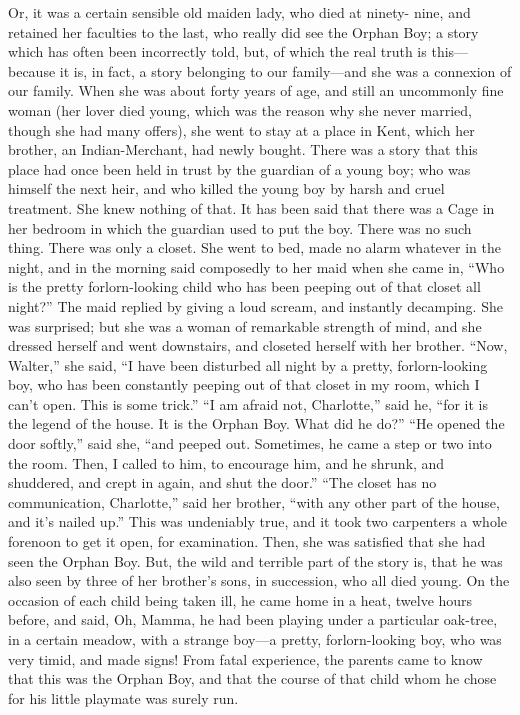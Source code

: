 Or, it was a certain sensible old maiden lady, who died at ninety-%
nine, and retained her faculties to the last, who really did see the
Orphan Boy; a story which has often been incorrectly told, but, of
which the real truth is this---because it is, in fact, a story
belonging to our family---and she was a connexion of our family.
When she was about forty years of age, and still an uncommonly fine
woman (her lover died young, which was the reason why she never
married, though she had many offers), she went to stay at a place in
Kent, which her brother, an Indian-Merchant, had newly bought.
There was a story that this place had once been held in trust by the
guardian of a young boy; who was himself the next heir, and who
killed the young boy by harsh and cruel treatment.  She knew nothing
of that.  It has been said that there was a Cage in her bedroom in
which the guardian used to put the boy.  There was no such thing.
There was only a closet.  She went to bed, made no alarm whatever in
the night, and in the morning said composedly to her maid when she
came in, ``Who is the pretty forlorn-looking child who has been
peeping out of that closet all night?''  The maid replied by giving a
loud scream, and instantly decamping.  She was surprised; but she
was a woman of remarkable strength of mind, and she dressed herself
and went downstairs, and closeted herself with her brother.  ``Now,
Walter,'' she said, ``I have been disturbed all night by a pretty,
forlorn-looking boy, who has been constantly peeping out of that
closet in my room, which I can't open.  This is some trick.''  ``I am
afraid not, Charlotte,'' said he, ``for it is the legend of the house.
It is the Orphan Boy.  What did he do?''  ``He opened the door
softly,'' said she, ``and peeped out.  Sometimes, he came a step or
two into the room.  Then, I called to him, to encourage him, and he
shrunk, and shuddered, and crept in again, and shut the door.''  ``The
closet has no communication, Charlotte,'' said her brother, ``with any
other part of the house, and it's nailed up.''  This was undeniably
true, and it took two carpenters a whole forenoon to get it open,
for examination.  Then, she was satisfied that she had seen the
Orphan Boy.  But, the wild and terrible part of the story is, that
he was also seen by three of her brother's sons, in succession, who
all died young.  On the occasion of each child being taken ill, he
came home in a heat, twelve hours before, and said, Oh, Mamma, he
had been playing under a particular oak-tree, in a certain meadow,
with a strange boy---a pretty, forlorn-looking boy, who was very
timid, and made signs!  From fatal experience, the parents came to
know that this was the Orphan Boy, and that the course of that child
whom he chose for his little playmate was surely run.

